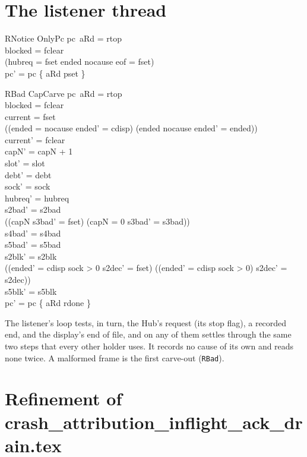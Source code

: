 \documentclass[a4paper,10pt,fleqn]{article}
\begin{document}
\section{The listener thread}

\begin{schema}{RNotice}
  OnlyPc
\where
  pc~aRd = rtop \\
  blocked = fclear \\
  (hubreq = fset \lor ended \neq nocause \lor eof = fset) \\
  pc' = pc \oplus \{ aRd \mapsto pset \}
\end{schema}

\begin{schema}{RBad}
  CapCarve
\where
  pc~aRd = rtop \\
  blocked = fclear \\
  current = fset \\
  ((ended = nocause \land ended' = cdisp) \lor (ended \neq nocause \land ended' = ended)) \\
  current' = fclear \\
  capN' = capN + 1 \\
  slot' = slot \\
  debt' = debt \\
  sock' = sock \\
  hubreq' = hubreq \\
  s2bad' = s2bad \\
  ((capN  \land s3bad' = fset) \lor (capN = 0 \land s3bad' = s3bad)) \\
  s4bad' = s4bad \\
  s5bad' = s5bad \\
  s2blk' = s2blk \\
  ((ended' = cdisp \land sock > 0 \land s2dec' = fset) \lor
    (\lnot (ended' = cdisp \land sock > 0) \land s2dec' = s2dec)) \\
  s5blk' = s5blk \\
  pc' = pc \oplus \{ aRd \mapsto rdone \}
\end{schema}

The listener's loop tests, in turn, the Hub's request (its stop flag), a
recorded end, and the display's end of file, and on any of them settles through
the same two steps that every other holder uses.  It records no cause of its
own and reads none twice.  A malformed frame is the first carve-out
(\texttt{RBad}).

\section{Refinement of crash\_attribution\_inflight\_ack\_drain.tex}
\end{document}
